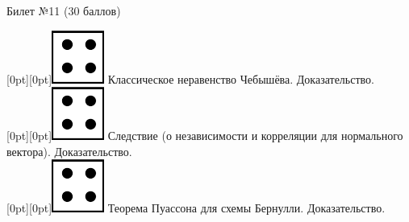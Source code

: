 \documentclass[10pt]{article}
\begin{document}
\thispagestyle{empty}

\topskip=0pt

\vspace*{\fill}

\begin{center} {\Large Билет №11 (30 баллов)} \end{center}

\raisebox{-1pt}[0pt][0pt]{\includegraphics[width=0.02\linewidth]{4.png}} Классическое неравенство Чебышёва. Доказательство. \\

\raisebox{-1pt}[0pt][0pt]{\includegraphics[width=0.02\linewidth]{4.png}} Следствие (о независимости и корреляции для нормального вектора). Доказательство. \\ 

\raisebox{-1pt}[0pt][0pt]{\includegraphics[width=0.02\linewidth]{4.png}} Теорема Пуассона для схемы Бернулли. Доказательство. \\









\vspace*{\fill}
\end{document}
